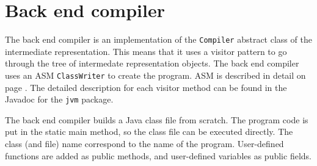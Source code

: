 \section{Back end compiler}

The back end compiler is an implementation of the \texttt{Compiler} abstract class of the intermediate representation.
This means that it uses a visitor pattern to go through the tree of intermedate representation objects.
The back end compiler uses an ASM \texttt{ClassWriter} to create the program.
ASM is described in detail on page \pageref{subj:asm}.
The detailed description for each visitor method can be found in the Javadoc for the \texttt{jvm} package.

The back end compiler builds a Java class file from scratch.
The program code is put in the static main method, so the class file can be executed directly.
The class (and file) name correspond to the name of the program.
User-defined functions are added as public methods, and user-defined variables as public fields.
